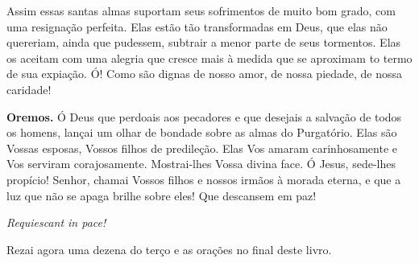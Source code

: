 Assim essas santas almas suportam seus sofrimentos de muito bom grado, com uma resignação perfeita. Elas estão tão transformadas em Deus, que elas não quereriam, ainda que pudessem, subtrair a menor parte de seus tormentos. Elas os aceitam com uma alegria que cresce mais à medida que se aproximam to termo de sua expiação. Ó! Como são dignas de nosso amor, de nossa piedade, de nossa caridade!


\vspace{\baselineskip}\noindent \textbf{Oremos.} Ó Deus que perdoais aos pecadores e que desejais a salvação de todos os homens, lançai um olhar de bondade sobre as almas do Purgatório. Elas são Vossas esposas, Vossos filhos de predileção. Elas Vos amaram carinhosamente e Vos serviram corajosamente. Mostrai-lhes Vossa divina face. Ó Jesus, sede-lhes propício! Senhor, chamai Vossos filhos e nossos irmãos à morada eterna, e que a luz que não se apaga brilhe sobre eles! Que descansem em paz!



\begin{center}
\textit{Requiescant in pace!}
\end{center}

Rezai agora uma dezena do terço e as orações no final deste livro.
